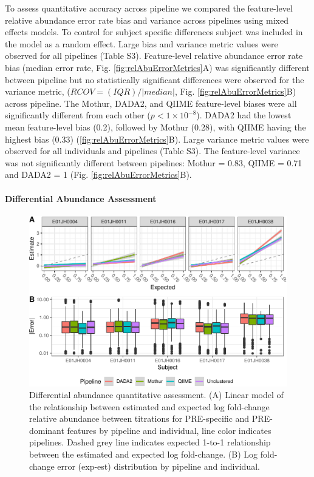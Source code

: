\documentclass{bmcart}
\begin{document}
To assess quantitative accuracy across pipeline we compared the feature-level relative
abundance error rate bias and variance across pipelines
using mixed effects models. To control for subject specific differences
subject was included in the model as a random effect.
Large bias and variance metric values were
observed for all pipelines (Table S3).
Feature-level relative abundance error rate bias (median error rate, Fig.
\ref{fig:relAbuErrorMetrics}A) was significantly different between
pipeline but no statistically significant differences were observed
for the variance metric, (\(RCOV=(IQR)/|median|\), Fig.
\ref{fig:relAbuErrorMetrics}B) across pipeline. The Mothur, DADA2,
and QIIME feature-level biases were all significantly different from
each other (\(p < 1\times 10^{-8}\)). DADA2 had the lowest mean
feature-level bias (0.2), followed by Mothur (0.28), with QIIME having the highest bias
(0.33) (\ref{fig:relAbuErrorMetrics}B). Large variance metric values
were observed for all individuals and pipelines (Table S3). The feature-level variance was not
significantly different between pipelines: Mothur = 0.83, QIIME = 0.71
and DADA2 = 1 (Fig. \ref{fig:relAbuErrorMetrics}B).

\paragraph{Differential Abundance Assessment}
\begin{figure}
\centering
\includegraphics{logFCerror-1.pdf}
\caption{\label{fig:logFCerror} Differential abundance quantitative assessment. (A) Linear model of the relationship between
estimated and expected log fold-change relative abundance between titrations for PRE-specific and
PRE-dominant features by pipeline and individual, line color indicates
pipelines. Dashed grey line indicates expected 1-to-1 relationship
between the estimated and expected log fold-change. (B) Log fold-change
error (\textbar{}exp-est\textbar{}) distribution by pipeline and
individual.}
\end{figure}
\end{document}
